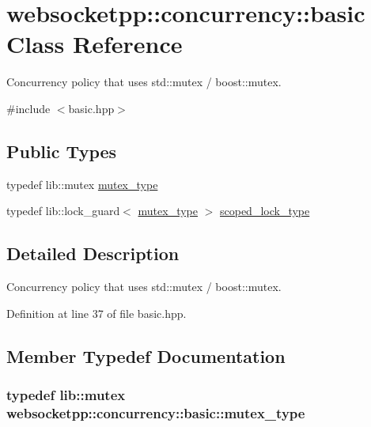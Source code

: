 \hypertarget{classwebsocketpp_1_1concurrency_1_1basic}{}\section{websocketpp\+:\+:concurrency\+:\+:basic Class Reference}
\label{classwebsocketpp_1_1concurrency_1_1basic}


Concurrency policy that uses std\+::mutex / boost\+::mutex.  




{\ttfamily \#include $<$basic.\+hpp$>$}

\subsection*{Public Types}
\begin{DoxyCompactItemize}
\item 
typedef lib\+::mutex \hyperlink{classwebsocketpp_1_1concurrency_1_1basic_aa017bc1a233b748f5e0e56b5e8a8c0bc}{mutex\+\_\+type}
\item 
typedef lib\+::lock\+\_\+guard$<$ \hyperlink{classwebsocketpp_1_1concurrency_1_1basic_aa017bc1a233b748f5e0e56b5e8a8c0bc}{mutex\+\_\+type} $>$ \hyperlink{classwebsocketpp_1_1concurrency_1_1basic_ac5f4f16695c8c578face2e4dac291b93}{scoped\+\_\+lock\+\_\+type}
\end{DoxyCompactItemize}


\subsection{Detailed Description}
Concurrency policy that uses std\+::mutex / boost\+::mutex. 

Definition at line 37 of file basic.\+hpp.



\subsection{Member Typedef Documentation}
\hypertarget{classwebsocketpp_1_1concurrency_1_1basic_aa017bc1a233b748f5e0e56b5e8a8c0bc}{}
\subsubsection[{mutex\+\_\+type}]{\setlength{\rightskip}{0pt plus 5cm}typedef lib\+::mutex {\bf websocketpp\+::concurrency\+::basic\+::mutex\+\_\+type}}\label{classwebsocketpp_1_1concurrency_1_1basic_aa017bc1a233b748f5e0e56b5e8a8c0bc}


